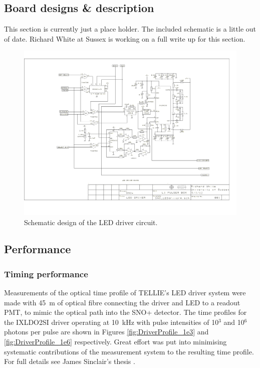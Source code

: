 \documentclass[12pt]{report}
\begin{document}
\subsection{Board designs \& description}
This section is currently just a place holder. The included schematic is a little out of date. Richard White at Sussex is working on a full write up for this section. 

\begin{figure}[htbp]
	\begin{center}
		\includegraphics[width=1.0\textwidth]{LEDDriverSchematic}
		\caption{Schematic design of the LED driver circuit.}
		\label{fig:LEDDriverSchematic}
	\end{center}
\end{figure}


\subsection{Performance}
\label{subsec:DriverPerformance}
\subsubsection{Timing performance}
Measurements of the optical time profile of TELLIE's LED driver system were made with 45~m of optical fibre connecting the driver and LED to a readout PMT, to mimic the optical path into the SNO+ detector. The time profiles for the IXLDO2SI driver operating at 10~kHz with pulse intensities of 10$^3$ and 10$^6$ photons per pulse are shown in Figures \ref{fig:DriverProfile_1e3} and \ref{fig:DriverProfile_1e6} respectively. Great effort was put into minimising systematic contributions of the measurement system to the resulting time profile. For full details see James Sinclair's thesis \cite{Sinclair}. 
\end{document}
